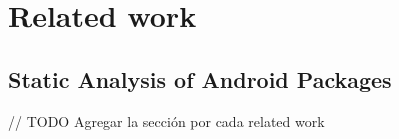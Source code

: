 
\chapter{Related work} %


\label{Chapter3} %


\section{Static Analysis of Android Packages}

// TODO Agregar la sección por cada related work
